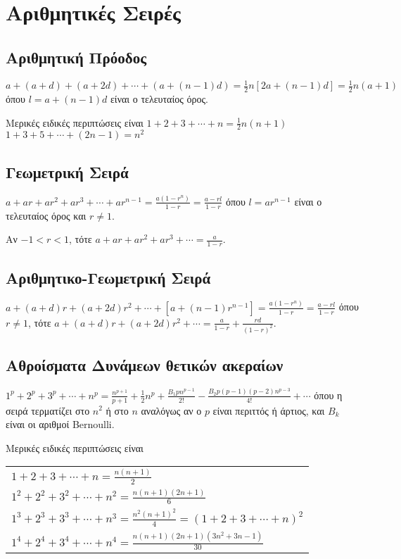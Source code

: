 
\section{Αριθμητικές Σειρές}

\subsection{Αριθμητική Πρόοδος}

$ a + (a+d) + (a+2d) + \cdots + (a+(n-1)d) = \frac{1}{2} n[2a + (n-1)d] =
\frac{1}{2} n(a+1) $ 
όπου $l = a + (n-1)d$ είναι ο τελευταίος όρος.

Μερικές ειδικές περιπτώσεις είναι
$ 1 + 2 + 3 + \cdots + n = \frac{1}{2} n(n+1) $ 
$ 1 + 3 + 5 + \cdots + (2n-1) = n^{2} $ 

\subsection{Γεωμετρική Σειρά}

$ a + ar + ar^{2} + ar^{3} + \cdots + ar^{n-1} = \frac{a(1-r^{n})}{1-r} =
\frac{a-rl}{1-r}$
όπου $ l=ar^{n-1} $ είναι ο τελευταίος όρος και $ r\neq 1 $. 

Αν $ -1<r<1 $, τότε $ a + ar + ar^{2} + ar^{3} + \cdots = \frac{a}{1-r}
$. 

\subsection{Αριθμητικο-Γεωμετρική Σειρά}
$ a + (a+d)r + (a+2d)r^{2} + \cdots + [a+(n-1)r^{n-1}] = \frac{a(1-r^{n})}{1-r}
= \frac{a-rl}{1-r} $ 
όπου $ r\neq 1 $, τότε
$ a + (a+d)r + (a+2d)r^{2} + \cdots = \frac{a}{1-r} + \frac{rd}{(1-r)^{2}}$. 

\subsection{Αθροίσματα Δυνάμεων θετικών ακεραίων}
$ 1^{p} + 2^{p} + 3^{p} + \cdots + n^{p} = \frac{n^{p+1}}{p+1} +
\frac{1}{2} n^{p} + \frac{B_{1} p n^{p-1}}{2!} - \frac{B_{2}
p(p-1)(p-2)n^{p-3}}{4!} + \cdots $
όπου η σειρά τερματίζει στο $ n^{2} $ ή στο $ n $ αναλόγως αν ο $ p $ είναι
περιττός ή άρτιος, και $ B_{k} $ είναι οι αριθμοί \textlatin{Bernoulli}.

Μερικές ειδικές περιπτώσεις είναι
\begin{tabular}{l}
    $1 + 2 + 3 + \cdots + n = \frac{n(n+1)}{2} $ \\ 
    $1^{2} + 2^{2} + 3^{2} + \cdots + n^{2} = \frac{n(n+1)(2n+1)}{6} $ \\
    $1^{3} + 2^{3} + 3^{3} + \cdots + n^{3} = \frac{n^{2}(n+1)^{2}}{4} =
    (1+2+3+\cdots + n)^{2}$ \\
    $ 1^{4} + 2^{4} + 3^{4} + \cdots + n^{4} =
    \frac{n(n+1)(2n+1)(3n^{2}+3n-1)}{30}$ \\
\end{tabular} 

